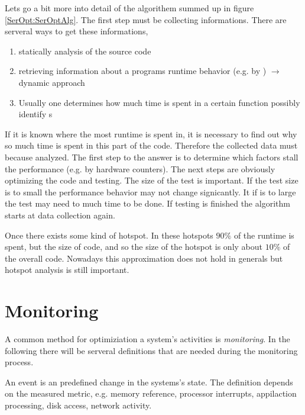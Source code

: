     Lets go a bit more into detail of the algorithem summed up in figure 
    \ref{SerOpt:SerOptAlg}. The first step must be collecting informations.
    There are serveral ways to get these informations,
    \begin{enumerate}
        \item   statically analysis of the source code
        \item   retrieving information about a programs runtime behavior
                (e.g. by )
                $\rightarrow$ dynamic approach
        \item   Usually one determines how much time is spent in a certain
                function possibly identify s
    \end{enumerate}
    If it is known where the most runtime is spent in, it is necessary to
    find out why so much time is spent in this part of the code. Therefore
    the collected data must because analyzed. The first step to the answer
    is to determine which factors stall the performance (e.g. by hardware
    counters). The next steps are obviously optimizing the code and testing.
    The size of the test is important. If the test size is to small the 
    performance behavior may not change signicantly. It if is to large the
    test may need to much time to be done. If testing is finished the 
    algorithm starts at data collection again.
    
    \begin{definition}    
        \label{SerOpt:HotSpot}
        Once there exists some kind of hotspot. In these
        hotspots $90\%$ of the runtime is spent, but the size of
        code, and so the size of the hotspot is only about $10\%$
        of the overall code. Nowadays this approximation does not hold in
        generals but hotspot analysis is still important.
    \end{definition}
    
    \section{Monitoring}
        \label{SerOpt:Monitoring}
        A common method for optimiziation a system's activities is 
        \emph{monitoring}. In the following there will be serveral definitions
        that are needed during the monitoring process.
        
        \begin{definition}[Event]
            \label{SerOpt:Event}
            An event is an predefined change in the systems's state. The
            definition depends on the measured metric, e.g. memory reference, 
            processor interrupts, appilaction processing, disk access, 
            network activity.
        \end{definition}
        
